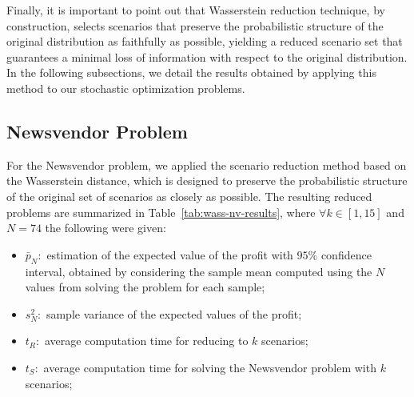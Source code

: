 \documentclass[a4paper,12pt]{article}
\begin{document}
	\noindent Finally, it is important to point out that Wasserstein reduction technique, by construction, selects scenarios that preserve the probabilistic structure of the original distribution as faithfully as possible, yielding a reduced scenario set that guarantees a minimal loss of information with respect to the original distribution. In the following subsections, we detail the results obtained by applying this method to our stochastic optimization problems. 
	
	\subsection{Newsvendor Problem}
	
	For the Newsvendor problem, we applied the scenario reduction method based on the Wasserstein distance, which is designed to preserve the probabilistic structure of the original set of scenarios as closely as possible. The resulting reduced problems are summarized in Table~\ref{tab:wass-nv-results}, where $\forall k \in [1,15]$ and $N = 74$ the following were given:
	\begin{itemize}
		\item $\bar{p}_{N}:$ estimation of the expected value of the profit with $95\%$ confidence interval, obtained by considering the sample mean computed using the $N$ values from solving the problem for each sample; 
		\item $s^{2}_{N}:$ sample variance of the expected values of the profit;
		\item $t_{R}:$ average computation time for reducing to $k$ scenarios;
		\item $t_{S}:$ average computation time for solving the Newsvendor problem with $k$ scenarios;
	\end{itemize}~
	
\end{document}

